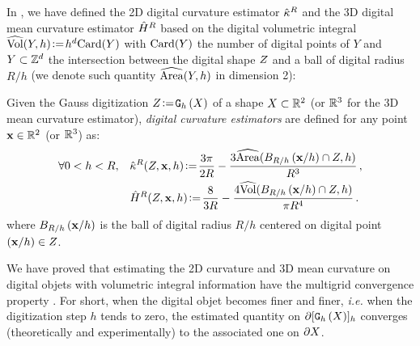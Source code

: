 \documentclass{llncs}
\newcommand{\ie}{\emph{i.e.} }
\begin{document}
In \cite{DGCI2013}, we have defined the 2D digital curvature estimator
$\hat{\kappa}^{R}$ and the 3D digital mean curvature estimator $\hat{H}^{R}$ based on
the digital volumetric integral $\widehat{\mathrm{Vol}}(Y,h) \!\mathrel{\mathop:}=\! h^d \mathrm{Card}(Y)$ with
$\mathrm{Card}(Y)$ the number of digital points of $Y$ and $Y \subset {\mathbb{Z}}^d$ the
intersection between the digital shape $Z$ and a ball of digital radius
$R/h$ (we denote such quantity $\widehat{\mathrm{Area}}(Y,h)$ in dimension 2):
%
\begin{Definition}
  Given the Gauss digitization $Z\!\mathrel{\mathop:}=\!\mathtt{G}_{h}\left(X\right)$ of a shape $X \subset {\mathbb{R}}^2$
  (or ${\mathbb{R}}^3$ for the 3D mean curvature estimator), {\em digital curvature
  estimators} are defined for any point $\mathbf{x} \in {\mathbb{R}}^2$ (or ${\mathbb{R}}^3$) as:
  \begin{align}
    \forall 0 < h < R,\quad
    &\hat{\kappa}^{R}(Z,\mathbf{x},h) \!\mathrel{\mathop:}=\! \frac{3\pi}{2R}
    - \frac{3\widehat{\mathrm{Area}}(B_{R/h}\left(\mathbf{x}/h\right) \cap
    {Z}, h)}{R^3}\,,\label{eq:dig-curvature-estimator-k}\\
    &\hat{H}^{R}(Z,\mathbf{x},h) \!\mathrel{\mathop:}=\! \frac{8}{3R}
    - \frac{4\widehat{\mathrm{Vol}}(B_{R/h}\left(\mathbf{x}/h\right) \cap
    Z, h)}{\pi R^4}\,.\label{eq:dig-curvature-estimator-H}
  \end{align}
  where $B_{R/h}\left(\mathbf{x}/h\right)$ is the ball of digital radius $R/h$ centered on
  digital point $(\mathbf{x}/h) \in Z$.
\end{Definition}
%
We have proved that estimating the 2D curvature and 3D mean curvature on digital
objets with volumetric integral information have the multigrid convergence
property \cite{DGCI2013}. For short, when the digital objet becomes finer and
finer, \ie when the digitization step $h$ tends to zero, the estimated quantity
on $\partial \lbrack \mathtt{G}_{h}\left(X\right) \rbrack_{h}$ converges (theoretically and experimentally) to the
associated one on $\partial X$.
%
\end{document}
